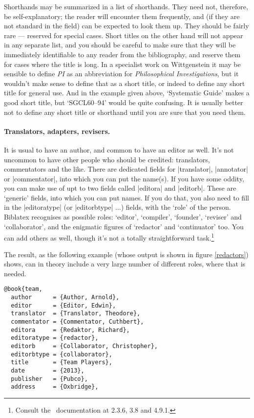 {Shorthands may be summarized in a list of shorthands. They need not, therefore, be self-explanatory; the reader will encounter them frequently, and (if they are not standard in the field) can be expected to look them up. They should be fairly rare --- reserved for special cases. Short titles on the other hand will not appear in any separate list, and you should be careful to make sure that they will be immediately identifiable to any reader from the bibliography, and reserve them for cases where the title is long. In a specialist work on Wittgenstein it may be sensible to define \emph{PI} as an abbreviation for \emph{Philosophical Investigations}, but it wouldn't make sense to define that as a short title, or indeed to define any short title for general use. And in the example given above, `Systematic Guide' makes a good short title, but `SGCL60--94' would be quite confusing. It is usually better not to define any short title or shorthand until you are sure that you need them.

\paragraph{Translators, adapters, revisers.} It is usual to have an author, and common to have an editor as well. It's not uncommon to have other people who should be credited: translators, commentators and the like. There are dedicated fields for |translator|, |annotator| or |commentator|, into which you can put the name(s). If you have some oddity, you can make use of upt to two fields called |editora| and |editorb|. These are `generic' fields, into which you can put names. If you do that, you also need to fill in the |editoratype| (or |editorbtype| ...) fields, with the `role' of the person. Biblatex recognises as possible roles: `editor', `compiler', `founder', `reviser' and `collaborator', and the enigmatic figures of `redactor' and `continuator' too. You can add others as well, though it's not a totally straightforward task.\footnote{Consult the \biblatex\ documentation at 2.3.6, 3.8 and 4.9.1.}

The result, as the following example (whose output is shown in figure \ref{redactors}) shows, can in theory include a very large number of different roles, where that is needed.

\begin{verbatim}
@book{team,
  author      = {Author, Arnold},
  editor      = {Editor, Edwin},
  translator  = {Translator, Theodore},
  commentator = {Commentator, Cuthbert},
  editora     = {Redaktor, Richard},
  editoratype = {redactor},
  editorb     = {Collaborator, Christopher},
  editorbtype = {collaborator},
  title       = {Team Players},
  date        = {2013},
  publisher   = {Pubco},
  address     = {Oxbridge},
\end{verbatim}

}
